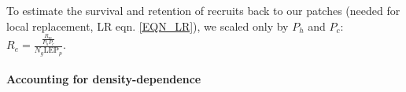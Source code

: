 \documentclass[12pt, oneside]{article}   	%
\begin{document}
To estimate the survival and retention of recruits back to our patches (needed for local replacement, LR eqn. \ref{EQN_LR}), we scaled only by $P_h$ and $P_c$: $R_e = \frac{\frac{R_m}{P_h P_c}}{N_g \text{LEP}_p}$.




\paragraph*{Accounting for density-dependence}  %
\end{document}
